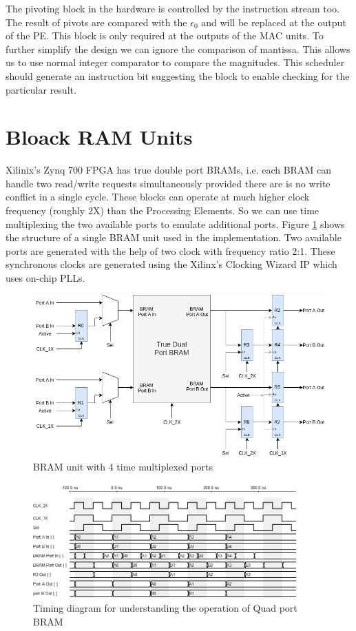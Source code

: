 The pivoting block in the hardware is controlled by the instruction stream too. The result
of pivots are compared with the $\epsilon_0$ and will be replaced at the output of the PE. 
This block is only required at the outputs of the MAC units. To further simplify the design
we can ignore the comparison of mantissa. This allows us to use normal integer 
comparator to compare the magnitudes. This scheduler should generate an instruction bit suggesting 
the block to enable checking for the particular result.

\section{Bloack RAM Units}
Xilinix's Zynq 700 FPGA has true double port BRAMs, i.e. each BRAM can handle two 
read/write requests simultaneously provided there are is no write conflict in a single cycle.
These blocks can operate at much higher clock frequency (roughly 2X) than the Processing Elements. So we can use
time multiplexing the two available ports to emulate additional ports. Figure \ref{fig:hs:bram} shows
the structure of a single BRAM unit used in the implementation. Two available ports are generated with the help
of two clock with frequency ratio 2:1. These synchronous clocks are generated using the Xilinx's 
Clocking Wizard IP which uses on-chip PLLs.

\begin{figure}[H]
    \centering
    \includegraphics[width = 0.9\linewidth]{./Hardware/quadPortBRAM.jpg}
    \caption{BRAM unit with 4 time multiplexed ports}
    \label{fig:hs:bram}
\end{figure}


\begin{figure}
    \centering
    \includegraphics[width = 0.9\textwidth]{./Hardware/bramWave.png}
    \caption{Timing diagram for understanding the operation of Quad port BRAM}
    \label{fig:bram:wave}
\end{figure}


